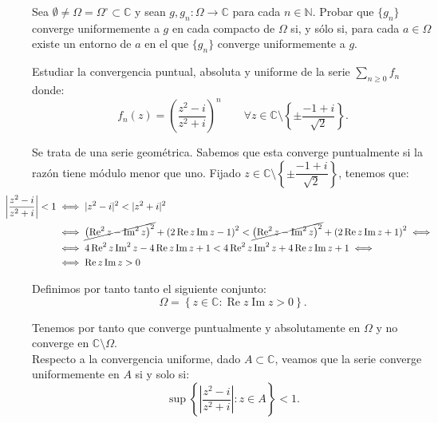 \documentclass[12pt]{article}
\renewcommand{\Re}{\operatorname{Re}} %
\renewcommand{\Im}{\operatorname{Im}}
\begin{document}
    \begin{ejercicio}
        Sea $\emptyset\neq \Omega=\Omega^\circ \subset \mathbb{C}$ y sean $g, g_n : \Omega \to \mathbb{C}$ para cada $n \in \mathbb{N}$. Probar que $\{g_n\}$ converge uniformemente a $g$ en cada compacto de $\Omega$ si, y sólo si, para cada $a \in \Omega$ existe un entorno de $a$ en el que $\{g_n\}$ converge uniformemente a $g$.
    \end{ejercicio}


    \newpage
    \setcounter{ejercicio}{0}

    \begin{ejercicio}[3 puntos]
        Estudiar la convergencia puntual, absoluta y uniforme de la serie $\sum\limits_{n \geq 0} f_n$ donde:
        \[
            f_n(z) = \left(\dfrac{z^2-i}{z^2+i}\right)^n\qquad \forall z \in \mathbb{C} \setminus \left\{\pm \dfrac{-1+i}{\sqrt{2}}\right\}.
        \]

        Se trata de una serie geométrica. Sabemos que esta converge puntualmente si la razón tiene módulo menor que uno. Fijado $z \in \mathbb{C} \setminus \left\{\pm \dfrac{-1+i}{\sqrt{2}}\right\}$, tenemos que:
        \begin{align*}
            \hspace{-1cm}\left|\dfrac{z^2-i}{z^2+i}\right| < 1 &\iff |z^2-i|^2 < |z^2+i|^2 \\
            \hspace{-1cm}&\iff \cancel{\left(\Re^2 z - \Im^ 2 z\right)^2} + \left(2 \Re z \Im z - 1\right)^2 < \cancel{\left(\Re^2 z - \Im^ 2 z\right)^2} + \left(2 \Re z \Im z + 1\right)^2 \iff\\
            \hspace{-1cm}&\iff 4\Re^2 z \Im^2 z - 4\Re z \Im z +1 < 4\Re^2 z \Im^2 z + 4\Re z \Im z +1 \iff\\
            &\iff \Re z\Im z > 0
        \end{align*}

        Definimos por tanto tanto el siguiente conjunto:
        \begin{equation*}
            \Omega = \left\{z \in \mathbb{C} : \Re z \Im z > 0\right\}.
        \end{equation*}

        Tenemos por tanto que converge puntualmente y absolutamente en $\Omega$ y no converge en $\mathbb{C} \setminus \Omega$.\\

        Respecto a la convergencia uniforme, dado $A\subset \mathbb{C}$, veamos que la serie converge uniformemente en $A$ si y solo si:
        \begin{equation*}
            \sup\left\{\left|\dfrac{z^2-i}{z^2+i}\right| : z \in A\right\} < 1.
        \end{equation*}
        \begin{comment}
        \begin{equation*}
            \inf\{\Re z \Im z : z \in A\} > 0.
        \end{equation*}
        

\end{comment}
\end{ejercicio}
\end{document}
